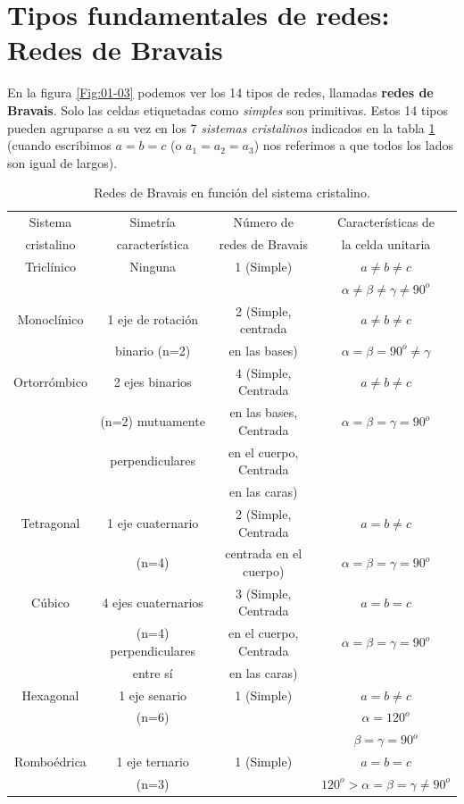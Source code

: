  \section{Tipos fundamentales de redes: Redes de Bravais}

En la figura \ref{Fig:01-03} podemos ver los 14 tipos de redes, llamadas {\bf redes de Bravais}. Solo las celdas etiquetadas como {\it simples} son primitivas. Estos 14 tipos pueden agruparse a su vez en los 7 {\it sistemas cristalinos} indicados en la  tabla \ref{Tab:01-01} (cuando escribimos $a=b=c$ (o $a_1=a_2=a_3$) nos referimos a que todos los lados son igual de largos).

\begin{table}[h!] \centering
    \begin{tabular}{cccc}
        Sistema  & Simetría  & Número de & Características de \\ 
        cristalino & característica & redes de Bravais & la celda unitaria \\
        \hline \hline 
        Triclínico & Ninguna & 1 (Simple) & $a \neq b \neq c$ \\
        & & & $\alpha \neq \beta \neq \gamma \neq 90^o$ \\ \hline
        Monoclínico & 1 eje de rotación & 2 (Simple, centrada & $a \neq b \neq c$ \\
        & binario (n=2) & en las bases) & $\alpha = \beta = 90^o \neq \gamma$ \\ \hline Ortorrómbico & 2 ejes binarios & 4 (Simple, Centrada & $a \neq b \neq c$ \\
        & (n=2) mutuamente & en las bases, Centrada & $ \alpha = \beta = \gamma = 90^o$ \\
        & perpendiculares & en el cuerpo, Centrada & \\
        & & en las caras) & \\ \hline
        Tetragonal  & 1 eje cuaternario & 2 (Simple, Centrada & $a=b\neq c$ \\
        & (n=4) & centrada en el cuerpo) & $ \alpha = \beta = \gamma = 90^o$ \\ \hline
        Cúbico & 4 ejes cuaternarios & 3 (Simple, Centrada & $a=b=c$ \\
        & (n=4) perpendiculares & en el cuerpo, Centrada & $ \alpha = \beta = \gamma = 90^o$ \\ 
        & entre sí & en las caras)  & \\ \hline 
        Hexagonal & 1 eje senario & 1 (Simple) & $a=b\neq c$ \\
        & (n=6) & & $\alpha=120^o$  \\
        & & & $\beta = \gamma = 90^o$ \\ \hline
        Romboédrica& 1 eje ternario & 1 (Simple) & $a=b=c$ \\ 
        & (n=3) & & $120^o > \alpha = \beta = \gamma \neq 90^o$\\ \hline
    \end{tabular}
    \caption{Redes de Bravais en función del sistema cristalino.}
    \label{Tab:01-01}
\end{table}


